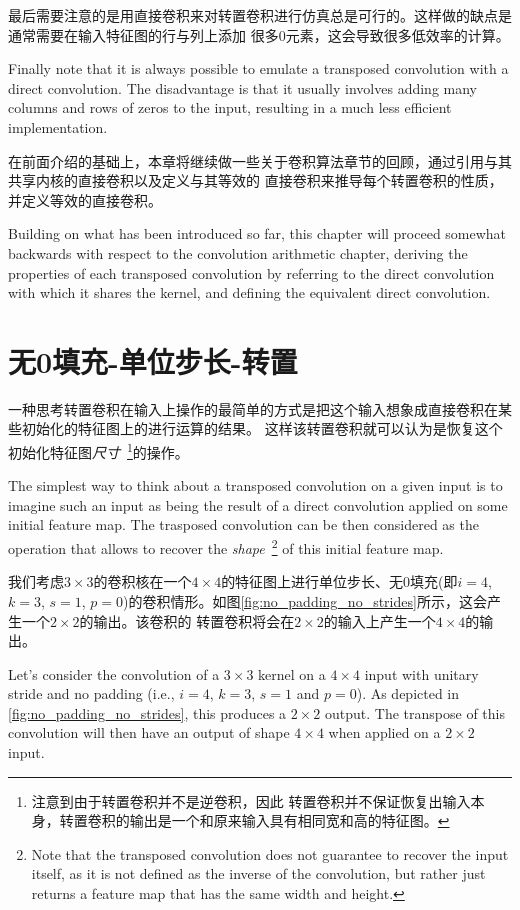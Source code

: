 \documentclass[notitlepage]{report}
\begin{document}
最后需要注意的是用直接卷积来对转置卷积进行仿真总是可行的。这样做的缺点是通常需要在输入特征图的行与列上添加
很多0元素，这会导致很多低效率的计算。 

Finally note that it is always possible to emulate a transposed convolution with
a direct convolution. The disadvantage is that it usually involves adding many
columns and rows of zeros to the input, resulting in a much less efficient
implementation.

在前面介绍的基础上，本章将继续做一些关于卷积算法章节的回顾，通过引用与其共享内核的直接卷积以及定义与其等效的
直接卷积来推导每个转置卷积的性质，并定义等效的直接卷积。

Building on what has been introduced so far, this chapter will proceed somewhat
backwards with respect to the convolution arithmetic chapter, deriving the
properties of each transposed convolution by referring to the direct
convolution with which it shares the kernel, and defining the equivalent direct
convolution.

\section{无0填充-单位步长-转置}

一种思考转置卷积在输入上操作的最简单的方式是把这个输入想象成直接卷积在某些初始化的特征图上的进行运算的结果。
这样该转置卷积就可以认为是恢复这个初始化特征图\emph{尺寸}~\footnote{注意到由于转置卷积并不是逆卷积，因此
转置卷积并不保证恢复出输入本身，转置卷积的输出是一个和原来输入具有相同宽和高的特征图。}的操作。

The simplest way to think about a transposed convolution on a given input is to
imagine such an input as being the result of a direct convolution applied on
some initial feature map. The trasposed convolution can be then considered as
the operation that allows to recover the \emph{shape}~\footnote{Note that the
  transposed convolution does not guarantee to recover the input itself, as it
  is not defined as the inverse of the convolution, but rather just returns a
  feature map that has the same width and height.} of this initial feature map.

我们考虑$3 \times 3$的卷积核在一个$4 \times 4$的特征图上进行单位步长、无0填充(即$i = 4$, $k = 3$, $s = 1$,
$p = 0$)的卷积情形。如图\autoref{fig:no_padding_no_strides}所示，这会产生一个$2 \times 2$的输出。该卷积的
转置卷积将会在$2 \times 2$的输入上产生一个$4 \times 4$的输出。

Let's consider the convolution of a $3 \times 3$ kernel on a $4 \times 4$
input with unitary stride and no padding (i.e., $i = 4$, $k = 3$, $s = 1$ and
$p = 0$). As depicted in \autoref{fig:no_padding_no_strides}, this produces a
$2 \times 2$ output. The transpose of this convolution will then have an output
of shape $4 \times 4$ when applied on a $2 \times 2$ input.
\end{document}
